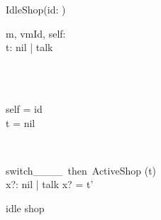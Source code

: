 \begin{figure}[H]
\centering
\begin{class}{IdleShop(id: \integer)}
\\
\begin{state}
m, vmId, self: \integer
\\t: nil | talk
\end{state} 
\\
\begin{init}
\\self = id
\\t = nil
\end{init} 
\\
\begin{op}{switch\_\_\_\_\ then\ ActiveShop}
\Delta (t)
\\x?: nil | talk
\ST
x? = t'
\end{op}
\end{class}
\caption{idle shop}
\label{fig_oz_idle_shop}
\end{figure}
